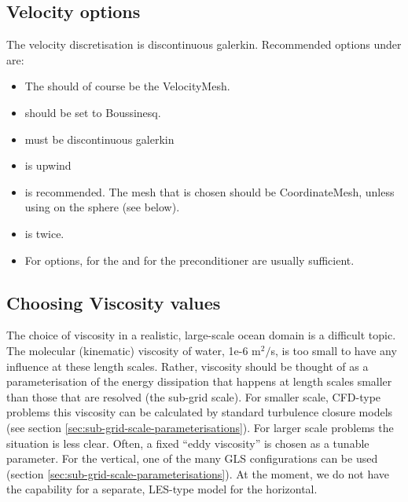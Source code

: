 \subsection{Velocity options}
The velocity discretisation is discontinuous galerkin. Recommended options under
 are:

\begin{itemize}
  \item The  should of course be the VelocityMesh.
  \item {} should be set to Boussinesq.
  \item {} must be discontinuous galerkin
  \item {} is upwind
  \item
     is
    recommended. The mesh that is chosen should be CoordinateMesh, unless
    using  on the sphere (see below).
  \item
    is twice.
  \item For  options,  for the
     and  for the preconditioner are
    usually sufficient.
\end{itemize}

\subsection{Choosing Viscosity values}
The choice of viscosity in a realistic, large-scale ocean domain is a difficult
topic. The molecular (kinematic) viscosity of water, 1e-6 m$^2/$s, is too small
to have any influence at these length scales. Rather, viscosity should be thought
of as a parameterisation of the energy dissipation that happens at length scales
smaller than those that are resolved (the sub-grid scale). For smaller 
scale, CFD-type problems this viscosity can be calculated by standard turbulence
closure models (see section \ref{sec:sub-grid-scale-parameterisations}). For
larger scale problems the situation is less clear. Often, a fixed ``eddy
viscosity'' is chosen as a tunable parameter. For the vertical, one of the many
GLS configurations can be used (section
\ref{sec:sub-grid-scale-parameterisations}). At the moment, we do not have the
capability for a separate, LES-type model for the horizontal. 

